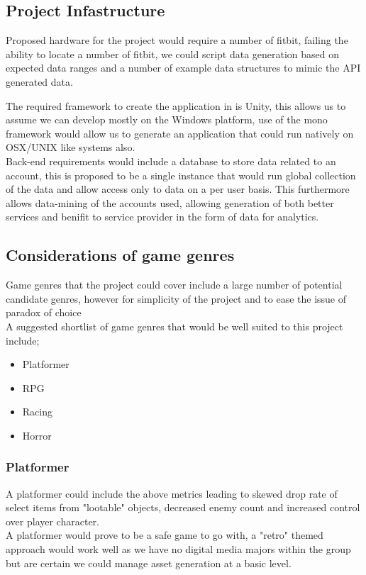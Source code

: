 \documentclass{article}
\begin{document}
        \pagebreak

        \subsection{Project Infastructure}
        Proposed hardware for the project would require a number of fitbit, failing the ability to
        locate a number of fitbit, we could script data generation based on expected data ranges and 
        a number of example data structures to mimic the API generated data.
        \par
        The required framework to create the application in is Unity, this allows us to assume we can 
        develop mostly on the Windows platform, use of the mono framework\cite{Mono} would allow us to generate
        an application that could run natively on OSX/UNIX like systems also.
        \\
        Back-end requirements would include a database to store data related to an account, this is 
        proposed to be a single instance that would run global collection of the data and allow access
        only to data on a per user basis. This furthermore allows data-mining of the accounts used,
        allowing generation of both better services and benifit to service provider in the form of
        data for analytics.

        \subsection{Considerations of game genres}
        Game genres that the project could cover include a large number of potential candidate genres, however
        for simplicity of the project and to ease the issue of paradox of choice\cite{Paradox-Of-Choice}
        \\
        A suggested shortlist of game genres that would be well suited to this project include;
        \begin{itemize}
            \item Platformer
            \item RPG
            \item Racing
            \item Horror
        \end{itemize}

        \subsubsection{Platformer}
        A platformer could include the above metrics leading to skewed drop rate of select items from 
        "lootable" objects, decreased enemy count and increased control over player character.
        \\
        A platformer would prove to be a safe game to go with, a "retro" themed approach would work well 
        as we have no digital media majors within the group but are certain we could manage asset generation
        at a basic level.
\end{document}
